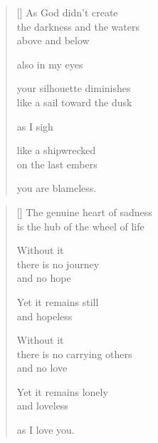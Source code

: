 \documentclass[14pt]{extbook}
\newcommand*{\centeredornament}{\centerline{\pgfornament[width=6cm]{88}}}
\begin{document}
\newpage

\vspace*{-15mm}
\centeredornament
\vspace*{-7mm}


\settowidth{\versewidth}{the darkness and the waters}

\begin{verse}[\versewidth]
  As God didn't create \\
  the darkness and the waters \\
  above and below

  also in my eyes

  your silhouette diminishes \\
  like a sail toward the dusk

  as I sigh

  like a shipwrecked \\
  on the last embers

  you are blameless.
\end{verse}


\newpage

\vspace*{-15mm}
\centeredornament
\vspace*{-7mm}


\settowidth{\versewidth}{is the hub of the wheel of life}

\begin{verse}[\versewidth]
  The genuine heart of sadness \\
  is the hub of the wheel of life

  Without it \\
  there is no journey \\
  and no hope

  Yet it remains still \\
  and hopeless

  Without it \\
  there is no carrying others \\
  and no love

  Yet it remains lonely \\
  and loveless

  as I love you.
\end{verse}

\end{document}
